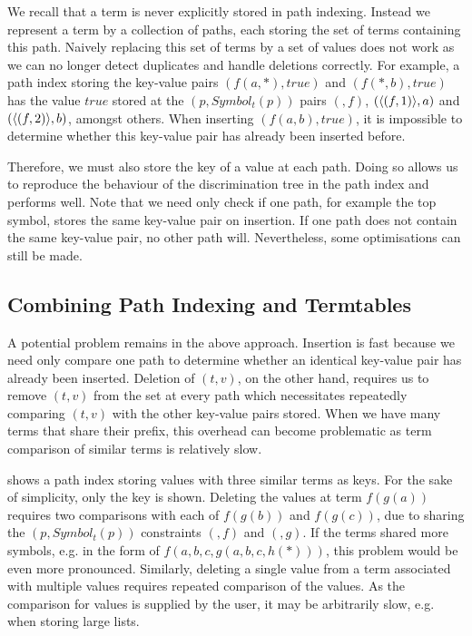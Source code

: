 We recall that a term is never explicitly stored in path indexing. Instead we represent a term by a collection of paths, each storing the set of terms containing this path. Naively replacing this set of terms by a set of values does not work as we can no longer detect duplicates and handle deletions correctly.
For example, a path index storing the key-value pairs $(f(a,*), true)$ and $(f(*,b), true)$ has the value $true$ stored at the $(p, Symbol_{t}(p))$ pairs $(\ang{}, f)$, $(\langle (f,1) \rangle, a)$ and $(\langle (f,2) \rangle, b)$, amongst others. When inserting $(f(a,b), true)$, it is impossible to determine whether this key-value pair has already been inserted before.

Therefore, we must also store the key of a value at each path. Doing so allows us to reproduce the behaviour of the discrimination tree in the path index and performs well. Note that we need only check if one path, for example the top symbol, stores the same key-value pair on insertion. If one path does not contain the same key-value pair, no other path will. Nevertheless, some optimisations can still be made.

\subsection{Combining Path Indexing and Termtables} \label{ptt}
A potential problem remains in the above approach. Insertion is fast because we need only compare one path to determine whether an identical key-value pair has already been inserted. Deletion of $(t,v)$, on the other hand, requires us to remove $(t,v)$ from the set at every path which necessitates repeatedly comparing $(t,v)$ with the other key-value pairs stored. When we have many terms that share their prefix, this overhead can become problematic as term comparison of similar terms is relatively slow.

 shows a path index storing values with three similar terms as keys. For the sake of simplicity, only the key is shown. Deleting the values at term $f(g(a))$ requires two comparisons with each of $f(g(b))$ and $f(g(c))$, due to sharing the $(p, Symbol_{t}(p))$ constraints $(\ang{}, f)$ and $(\ang{}, g)$. If the terms shared more symbols, e.g. in the form of $f(a,b,c,g(a,b,c,h(*)))$, this problem would be even more pronounced. Similarly, deleting a single value from a term associated with multiple values requires repeated comparison of the values. As the comparison for values is supplied by the user, it may be arbitrarily slow, e.g. when storing large lists.


